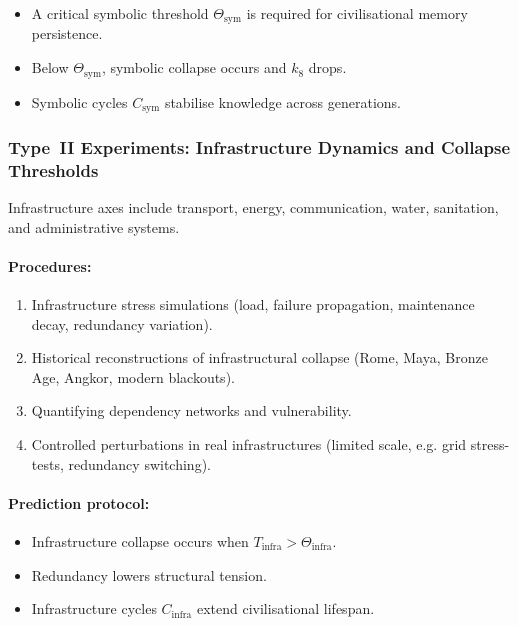 \begin{itemize}
    \item A critical symbolic threshold $\Theta_{\mathrm{sym}}$ is required 
          for civilisational memory persistence.
    \item Below $\Theta_{\mathrm{sym}}$, symbolic collapse occurs and $k_8$ drops.
    \item Symbolic cycles $C_{\mathrm{sym}}$ stabilise knowledge across generations.
\end{itemize}



\subsubsection{Type~II Experiments: Infrastructure Dynamics and Collapse Thresholds}

Infrastructure axes include transport, energy, communication, water,
sanitation, and administrative systems.

\paragraph{Procedures:}

\begin{enumerate}
    \item Infrastructure stress simulations (load, failure propagation,
          maintenance decay, redundancy variation).
    \item Historical reconstructions of infrastructural collapse 
          (Rome, Maya, Bronze Age, Angkor, modern blackouts).
    \item Quantifying dependency networks and vulnerability.
    \item Controlled perturbations in real infrastructures (limited scale,
          e.g. grid stress-tests, redundancy switching).
\end{enumerate}

\paragraph{Prediction protocol:}

\begin{itemize}
    \item Infrastructure collapse occurs when 
          $T_{\mathrm{infra}} > \Theta_{\mathrm{infra}}$.
    \item Redundancy lowers structural tension.
    \item Infrastructure cycles $C_{\mathrm{infra}}$ extend civilisational lifespan.
\end{itemize}



